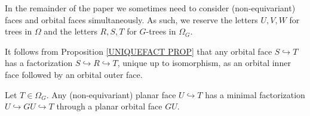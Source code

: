 \documentclass[a4paper,10pt
,draft
]{article}%
\begin{document}
\begin{notation}\label{TREEDIFNOT NOT}
	In the remainder of the paper we sometimes need to consider (non-equivariant) faces and orbital faces simultaneously.
	As such, we reserve the letters $U,V,W$ for trees in $\Omega$
	and the letters $R,S,T$ for $G$-trees in $\Omega_G$.
\end{notation}


\begin{remark}\label{INNOUTORB REM}
	It follows from Proposition \ref{UNIQUEFACT PROP} that any orbital face $S \hookrightarrow T$ has a factorization
	$S \hookrightarrow R \hookrightarrow T$, unique up to isomorphism, as an orbital inner face followed by an orbital outer face.	
\end{remark}


\begin{proposition}\label{MINGFACT PROP}
	Let $T \in \Omega_G$.
	Any (non-equivariant) planar face $U \hookrightarrow T$ has a minimal factorization
	$U \hookrightarrow GU \hookrightarrow T$
	through a planar orbital face $GU$.
\end{proposition}
\end{document}
